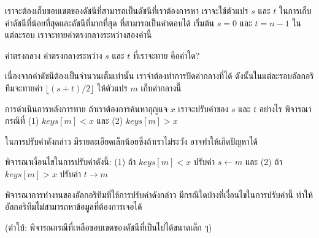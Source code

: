 เรา{\wbr}จะ{\wbr}ต้อง{\wbr}เก็บ{\wbr}ขอบเขต{\wbr}ของ{\wbr}ดัชนี{\wbr}ที่{\wbr}สามารถ{\wbr}เป็น{\wbr}ดัชนี{\wbr}ที่{\wbr}เรา{\wbr}ต้องการ{\wbr}หา เรา{\wbr}จะ{\wbr}ใช้{\wbr}ตัวแปร $s$
และ $t$ ใน{\wbr}การ{\wbr}เก็บ{\wbr}ค่า{\wbr}ดัชนี{\wbr}ที่{\wbr}น้อย{\wbr}ที่สุด{\wbr}และ{\wbr}ดัชนี{\wbr}ที่{\wbr}มาก{\wbr}ที่สุด ที่{\wbr}สามารถ{\wbr}เป็น{\wbr}คำตอบ{\wbr}ได้ เริ่มต้น{\wbr}
$s=0$ และ $t=n-1$ ใน{\wbr}แต่ละ{\wbr}รอบ เรา{\wbr}จะ{\wbr}ทาย{\wbr}ค่า{\wbr}ตรง{\wbr}กลาง{\wbr}ระหว่าง{\wbr}สอง{\wbr}ค่า{\wbr}นี้{\wbr}

\begin{quiz}{ค่า{\wbr}ตรง{\wbr}กลาง}
ค่า{\wbr}ตรง{\wbr}กลาง{\wbr}ระหว่าง $s$ และ $t$ ที่{\wbr}เรา{\wbr}จะ{\wbr}ทาย คือ{\wbr}ค่า{\wbr}ใด?
\end{quiz}

เนื่องจาก{\wbr}ค่า{\wbr}ดัชนี{\wbr}ต้อง{\wbr}เป็น{\wbr}จำนวนเต็ม{\wbr}เท่านั้น เรา{\wbr}จำ{\wbr}ต้อง{\wbr}ทำ{\wbr}การ{\wbr}ปัด{\wbr}ค่า{\wbr}กลาง{\wbr}ที่{\wbr}ได้{\wbr}
ดังนั้น{\wbr}ใน{\wbr}แต่ละ{\wbr}รอบ{\wbr}อัล{\wbr}กอ{\wbr}ริ{\wbr}ทึม{\wbr}จะ{\wbr}ทาย{\wbr}ค่า $\lfloor (s+t)/2 \rfloor$ ให้{\wbr}ตัวแปร $m$
เก็บ{\wbr}ค่า{\wbr}กลาง{\wbr}นี้{\wbr}

\begin{quiz}{การ{\wbr}ดำเนินการ{\wbr}หลัง{\wbr}การ{\wbr}ทาย}
ถ้า{\wbr}เรา{\wbr}ต้องการ{\wbr}ค้นหา{\wbr}กุญแจ $x$ เรา{\wbr}จะ{\wbr}ปรับ{\wbr}ค่า{\wbr}ของ $s$ และ $t$ อย่างไร พิจารณา{\wbr}กรณี{\wbr}ที่ (1)
$keys[m] < x$ และ (2) $keys[m] > x$
\end{quiz}

ใน{\wbr}การ{\wbr}ปรับ{\wbr}ค่า{\wbr}ดังกล่าว{\wbr}
มี{\wbr}รายละเอียด{\wbr}เล็กน้อย{\wbr}ซึ่ง{\wbr}ถ้า{\wbr}เรา{\wbr}ไม่{\wbr}ระวัง อาจ{\wbr}ทำ{\wbr}ให้{\wbr}เกิด{\wbr}ปัญหา{\wbr}ได้{\wbr}

\begin{quiz}{พิจารณา{\wbr}เงื่อนไข{\wbr}ใน{\wbr}การ{\wbr}ปรับ{\wbr}ค่า{\wbr}ดังนี้: (1) ถ้า $keys[m] < x$ ปรับ{\wbr}ค่า $s\leftarrow m$ และ (2)}
ถ้า $keys[m] > x$ ปรับ{\wbr}ค่า $t\rightarrow m$  

พิจารณา{\wbr}การ{\wbr}ทำงาน{\wbr}ของ{\wbr}อัล{\wbr}กอ{\wbr}ริ{\wbr}ทึม{\wbr}ที่{\wbr}ใช้{\wbr}การ{\wbr}ปรับ{\wbr}ค่า{\wbr}ดังกล่าว มี{\wbr}กรณี{\wbr}ใด{\wbr}บ้าง{\wbr}ที่{\wbr}เงื่อนไข{\wbr}ใน{\wbr}การ{\wbr}ปรับ{\wbr}ค่า{\wbr}นี้{\wbr}
ทำ{\wbr}ให้{\wbr}อัล{\wbr}กอ{\wbr}ริ{\wbr}ทึม{\wbr}ไม่{\wbr}สามารถ{\wbr}หา{\wbr}ข้อมูล{\wbr}ที่{\wbr}ต้องการ{\wbr}เจอ{\wbr}ได้{\wbr}

(ตำ{\wbr}ใบ้: พิจารณกรณี{\wbr}ที่{\wbr}เหลือ{\wbr}ขอบเขต{\wbr}ของ{\wbr}ดัชนี{\wbr}ที่{\wbr}เป็น{\wbr}ไป{\wbr}ได้{\wbr}ขนาด{\wbr}เล็ก ๆ)
\end{quiz}

